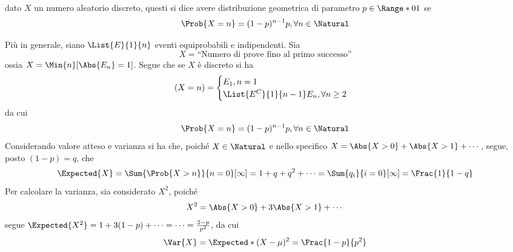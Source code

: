 \documentclass{subfiles}
\begin{document}
\begin{Definition*}
    dato $X$ un numero aleatorio discreto, questi si dice avere distribuzione geometrica di parametro $p \in \Range*{0}{1}$ se
    $$
        \Prob{X = n} = (1 - p)^{n - 1} p, \forall n \in \Natural
    $$
\end{Definition*}
Più in generale, siano \(\List{E}{1}{n}\) eventi equiprobabili e indipendenti. Sia
$$
    X = \text{``Numero di prove fino al primo successo''}
$$
ossia $X = \Min{n}[\Abs{E_{n}} = 1]$. Segue che se $X$ è discreto si ha
$$
    (X = n) = \begin{cases}
        E_{1}, n = 1 \\
        \List{{E^{C}}}{1}{n - 1}E_{n}, \forall n \ge 2
    \end{cases}
$$
da cui
$$
    \Prob{X = n} =(1 - p)^{n - 1}p, \forall n \in \Natural
$$
Considerando valore atteso e varianza si ha che, poiché $X \in \Natural$ e nello specifico $X = \Abs{X > 0} + \Abs{X > 1} + \cdots$,
segue, posto $(1 - p) = q$, che
$$
    \Expected{X} = \Sum{\Prob{X > n}}{n = 0}[\infty]  = 1 + q + q^{2} + \cdots = \Sum{q_{i}}{i = 0}[\infty] = \Frac{1}{1 - q}
$$
Per calcolare la varianza, sia considerato $X^{2}$, poiché
$$
    X^{2} = \Abs{X > 0} + 3 \Abs{X > 1} + \cdots
$$
segue $\Expected{X^{2}} = 1 + 3(1 - p) + \cdots = \cdots = \tfrac{2 - p}{p^{2}}$, da cui
$$
    \Var{X} = \Expected*{(X - \mu)^{2}} = \Frac{1 - p}{p^{2}}
$$
\end{document}
